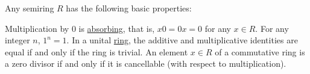 \begin{proposition}\label{thm:semiring_properties}
  Any semiring \( R \) has the following basic properties:
  \begin{PropEnum}
     Multiplication by \( 0 \) is \hyperref[def:algebraic_theory/absorbing_element]{absorbing}, that is, \( x0 = 0x = 0 \) for any \( x \in R \).
     For any integer \( n \), \( 1^n = 1 \).
     In a unital \hyperref[def:semiring/unital_ring]{ring}, the additive and multiplicative identities are equal if and only if the ring is trivial.
     An element \( x \in R \) of a commutative ring is a zero divisor if and only if it is cancellable (with respect to multiplication).
  \end{PropEnum}
\end{proposition}
